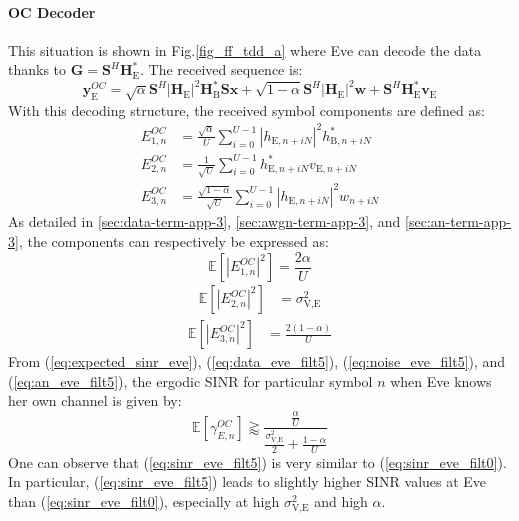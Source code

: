 \documentclass[journal,comsoc]{IEEEtran}
\newcommand{\module}[1]{\left|#1\right|}
\newcommand{\EX}[1]{\mathbb{E} \left[#1\right]}%
\newcommand{\HE}{\textbf{H}_{\text{E}}}
\newcommand{\HB}{\textbf{H}_{\text{B}}}
\newcommand{\ve}{\textbf{v}_{\text{E}}}
\newcommand{\spread}{\textbf{S}}
\newcommand{\w}{\textbf{w}}
\begin{document}
\paragraph{OC Decoder}
\label{sec:own-channel-knowledge}
This situation is shown in Fig.\ref{fig_ff_tdd_a} where Eve can decode the data thanks to $\textbf{G} = \spread^H \HE^*$. The received sequence is:
\begin{equation}
	\textbf{y}_{\text{E}}^{OC} = \sqrt{\alpha} \spread^H \module{\HE}^2 \HB^* \spread\textbf{x} +  \sqrt{1-\alpha} \spread^H \module{\HE}^2 \w  +  \spread^H  \HE^*  \ve
	\label{eq:rx_eve_filt5}
\end{equation}
With this decoding structure, the received symbol components are defined as:
\begin{equation}
\begin{split}
E_{1,n}^{OC} &= \frac{\sqrt{\alpha}}{U}\sum_{i=0}^{U-1}  \left|h_{\text{E}, n + iN}\right|^2  h_{\text{B}, n + iN}^* \\
E_{2,n}^{OC} &= \frac{1}{\sqrt{U}}\sum_{i=0}^{U-1} h^*_{\text{E}, n + iN}  v_{\text{E}, n + iN}\\
E_{3,n}^{OC} &=\frac{ \sqrt{1-\alpha}  }{\sqrt{U}}\sum_{i=0}^{U-1}   \left|h_{\text{E}, n + iN}\right|^2 w_{n + iN}
\end{split}
\end{equation}
As detailed in  \ref{sec:data-term-app-3},  \ref{sec:awgn-term-app-3}, and \ref{sec:an-term-app-3}, the components can respectively be expressed as:
\begin{equation}
\EX{|E_{1,n}^{OC}|^2} = \frac{2\alpha}{U}
\label{eq:data_eve_filt5}
\end{equation}
\begin{equation}
\begin{split}
\EX{|E_{2,n}^{OC}|^2} &= \sigma^2_{\text{V,E}}
\end{split}
\label{eq:noise_eve_filt5}
\end{equation}
\begin{equation}
\begin{split}
\EX{|E_{3,n}^{OC}|^2}  &=  \frac{2(1-\alpha)}{U}
\end{split}
\label{eq:an_eve_filt5}
\end{equation}
From (\ref{eq:expected_sinr_eve}), (\ref{eq:data_eve_filt5}), (\ref{eq:noise_eve_filt5}), and (\ref{eq:an_eve_filt5}),  the ergodic SINR for particular symbol $n$ when Eve knows her own channel is given by:
\begin{equation}
\EX{\gamma_{E,n}^{OC}} \gtrapprox \frac{\frac{\alpha }{U}}{\frac{\sigma^2_{\text{V,E}}}{2} + \frac{1-\alpha}{U}}
\label{eq:sinr_eve_filt5}
\end{equation}
One can observe that (\ref{eq:sinr_eve_filt5}) is very similar to (\ref{eq:sinr_eve_filt0}). In particular, (\ref{eq:sinr_eve_filt5}) leads to slightly higher SINR values at Eve than (\ref{eq:sinr_eve_filt0}), especially at high $\sigma^2_{\text{V,E}}$ and high $\alpha$. 
\end{document}
